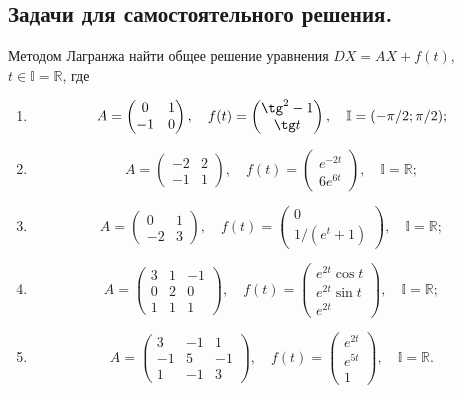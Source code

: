 \documentclass[a4paper, 12pt]{article}
\newcommand{\Rm}{\mathbb{R}}
\newcommand{\I}{\mathbb{I}}
\begin{document}
\subsection*{Задачи для самостоятельного решения.}
Методом Лагранжа найти общее решение уравнения $DX = AX + f(t)$, $t \in \I = \Rm$, где \begin{enumerate}
	\item $$A = \begin{pmatrix}
		0 & 1\\
		-1 & 0
	\end{pmatrix},\quad f(t) = \begin{pmatrix}
	\tg^2 - 1\\
	\tg t
\end{pmatrix},\quad \I = (-\pi/2; \pi/2);$$
\item $$A = \begin{pmatrix}
	-2 & 2\\
	-1 & 1
\end{pmatrix},\quad f(t) = \begin{pmatrix}
e^{-2t}\\6e^{6t}
\end{pmatrix},\quad \I = \Rm;$$
\item $$A = \begin{pmatrix}
	0 & 1\\
	-2 & 3
\end{pmatrix},\quad f(t) = \begin{pmatrix}
	0\\1/(e^t + 1)
\end{pmatrix},\quad \I = \Rm;$$
\item $$A = \begin{pmatrix}
	3 & 1 & -1\\
	0 & 2 & 0\\
	1 & 1 & 1
\end{pmatrix}, \quad f(t) =\begin{pmatrix}
	e^{2t}\cos t\\
		e^{2t}\sin t\\
	e^{2t}
\end{pmatrix},\quad \I = \Rm;$$
\item $$A = \begin{pmatrix}
	3 & -1 & 1\\
	-1 & 5 & -1\\
	1 & -1 & 3
\end{pmatrix}, \quad f(t) =\begin{pmatrix}
	e^{2t}\\
	e^{5t}\\
	1
\end{pmatrix},\quad \I = \Rm.$$
\end{enumerate}
\end{document}
